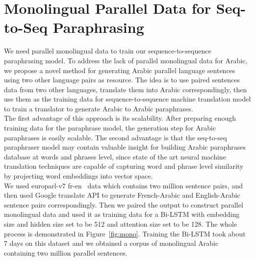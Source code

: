 \documentclass[11pt,letterpaper]{article}
\begin{document}
\section{Monolingual Parallel Data for Seq-to-Seq Paraphrasing}
\label{pg}
We need parallel monolingual data to train our sequence-to-sequence paraphrasing model. To address the lack of parallel monolingual data for Arabic, we propose a novel method for generating Arabic parallel language sentences using two other language pairs as resource. The idea is to use paired sentences data from two other languages, translate them into Arabic correspondingly, then use them as the  training data for sequence-to-sequence machine translation model to train a translator  to generate Arabic to Arabic paraphrases.\\  
The first advantage of this approach is its scalability. After preparing enough training data for the paraphrase model, the generation step for Arabic paraphrases is easily scalable. The second advantage is that the seq-to-seq paraphraser model may contain valuable insight for  building Arabic paraphrases database at  words and phrases level, since state of the art neural machine translation techniques are capable of capturing word and phrase level similarity by projecting word embeddings into vector space.\\
We used europarl-v7 fr-en~\cite{Koehn_europarl} data which contains two million sentence pairs, and then used Google translate API to generate French-Arabic and English-Arabic sentence pairs correspondingly. Then we paired the output to construct parallel monolingual data and used it as training data for a Bi-LSTM with embedding size and hidden size set to be 512 and attention size set to be 128. The whole process is demonstrated in Figure~\ref{fig:mono}. Training the Bi-LSTM took about 7 days on this dataset and we obtained a corpus of monolingual Arabic containing two million parallel sentences.\\ 
\end{document}
